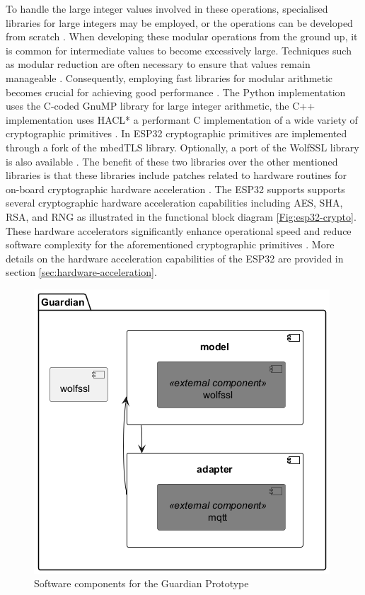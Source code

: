 To handle the large integer values involved in these operations, specialised libraries for large integers may be employed, or the operations can be developed from scratch \cite[21, 25-26]{eg-spec}. When developing these modular operations from the ground up, it is common for intermediate values to become excessively large. Techniques such as modular reduction are often necessary to ensure that values remain manageable \cite[21, 25-26]{eg-spec}. Consequently, employing fast libraries for modular arithmetic becomes crucial for achieving good performance \cite[22]{eg-paper}. The Python implementation uses the C-coded GnuMP library \cite{python-reference} for large integer arithmetic, the C++ implementation uses HACL* a performant C implementation of a wide variety of cryptographic primitives \cite[22]{eg-paper} \cite{cpp-reference}. In ESP32 cryptographic primitives are implemented through a fork of the mbedTLS library. Optionally, a port of the WolfSSL library is also available \cite{esp32-ref}. The benefit of these two libraries over the other mentioned libraries is that these libraries include patches related to hardware routines for on-board cryptographic hardware acceleration \cite{esp32-ref} \cite[114]{wolfSSL-manual}. The ESP32 supports supports several cryptographic hardware acceleration capabilities including \ac{AES}, \ac{SHA}, \ac{RSA}, and \ac{RNG} as illustrated in the functional block diagram \ref{Fig:esp32-crypto}. These hardware accelerators significantly enhance operational speed and reduce software complexity for the aforementioned cryptographic primitives \cite[32]{esp32-series}. More details on the hardware acceleration capabilities of the ESP32 are provided in section \ref{sec:hardware-acceleration}.

\begin{figure}
	\centering
	\includegraphics[scale=.5]{abbildungen/Diagramme/components.png}
	\caption{Software components for the Guardian Prototype}\label{Fig:software-components} 
\end{figure}

